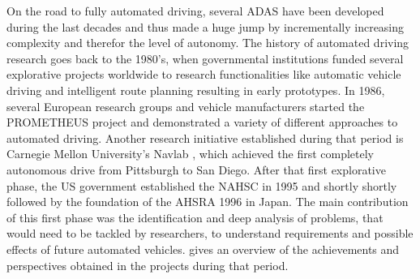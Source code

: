 On the road to fully automated driving, several \ac{ADAS} have been developed during the last decades and thus made a huge jump by incrementally increasing complexity and therefor the level of autonomy.
The history of automated driving research goes back to the 1980's, when governmental institutions funded several explorative projects worldwide to research functionalities like automatic vehicle driving and intelligent route planning resulting in early prototypes.
In 1986, several European research groups and vehicle manufacturers started the \ac{PROMETHEUS} project \cite{Dickmanns1990} and demonstrated a variety of different approaches to automated driving.
Another research initiative established during that period is Carnegie Mellon University's Navlab \cite{Thorpe1988}, which achieved the first completely autonomous drive from Pittsburgh to San Diego.
After that first explorative phase, the US government established the \ac{NAHSC} in 1995 and shortly shortly followed by the foundation of the \ac{AHSRA} 1996 in Japan.
The main contribution of this first phase was the identification and deep analysis of problems, that would need to be tackled by researchers, to understand requirements and possible effects of future automated vehicles.
\cite{Bertozzi2000} gives an overview of the achievements and perspectives obtained in the projects during that period.

